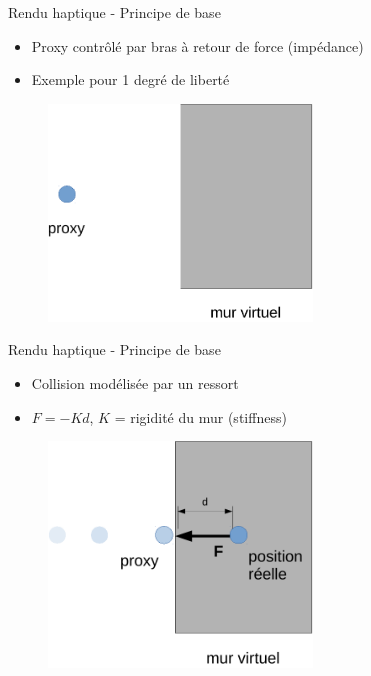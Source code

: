 \begin{frame}{Rendu haptique - Principe de base}
\begin{itemize}
\item Proxy contrôlé par bras à retour de force (impédance)
\item Exemple pour 1 degré de liberté
\end{itemize}
\begin{figure}
\centering
\includegraphics[width=7cm]{images/hapticRendering}{}
\end{figure}
\end{frame}

\begin{frame}{Rendu haptique - Principe de base}
\begin{itemize}
\item Collision modélisée par un ressort
\item $F = -Kd$, $K$ = rigidité du mur (stiffness)
\end{itemize}
\begin{figure}
\centering
\includegraphics[width=7cm]{images/hapticRendering2}{}
\end{figure}
\end{frame}

